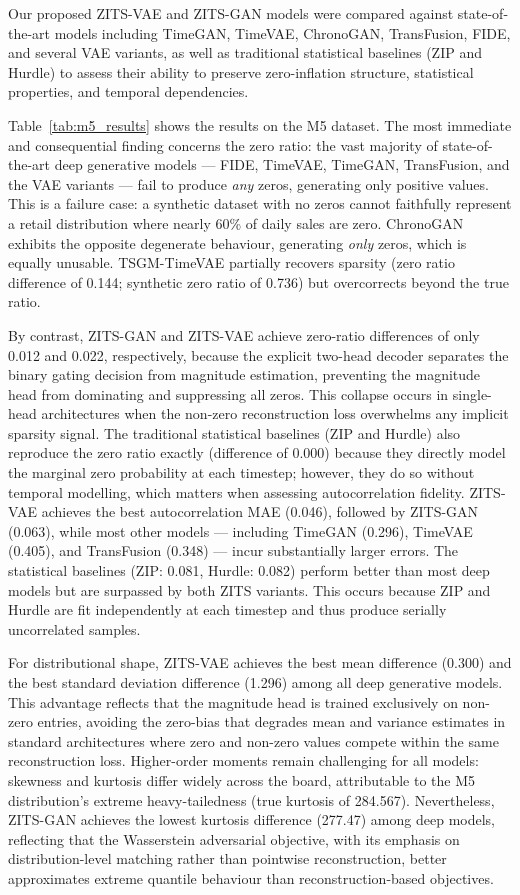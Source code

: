 \documentclass[make,article,submit,moreauthors]{Definitions/mdpi}
\begin{document}
Our proposed ZITS-VAE and ZITS-GAN models were compared against state-of-the-art models including TimeGAN, TimeVAE, ChronoGAN, TransFusion, FIDE, and several VAE variants, as well as traditional statistical baselines (ZIP and Hurdle) to assess their ability to preserve zero-inflation structure, statistical properties, and temporal dependencies.  

Table~\ref{tab:m5_results} shows the results on the M5 dataset. The most immediate and consequential finding concerns the zero ratio: the vast majority of state-of-the-art deep generative models — FIDE, TimeVAE, TimeGAN, TransFusion, and the VAE variants — fail to produce \emph{any} zeros, generating only positive values. This is a failure case: a synthetic dataset with no zeros cannot faithfully represent a retail distribution where nearly 60\% of daily sales are zero. ChronoGAN exhibits the opposite degenerate behaviour, generating \emph{only} zeros, which is equally unusable. TSGM-TimeVAE partially recovers sparsity (zero ratio difference of 0.144; synthetic zero ratio of 0.736) but overcorrects beyond the true ratio.

By contrast, ZITS-GAN and ZITS-VAE achieve zero-ratio differences of only 0.012 and 0.022, respectively, because the explicit two-head decoder separates the binary gating decision from magnitude estimation, preventing the magnitude head from dominating and suppressing all zeros. This collapse occurs in single-head architectures when the non-zero reconstruction loss overwhelms any implicit sparsity signal. The traditional statistical baselines (ZIP and Hurdle) also reproduce the zero ratio exactly (difference of 0.000) because they directly model the marginal zero probability at each timestep; however, they do so without temporal modelling, which matters when assessing autocorrelation fidelity. ZITS-VAE achieves the best autocorrelation MAE (0.046), followed by ZITS-GAN (0.063), while most other models — including TimeGAN (0.296), TimeVAE (0.405), and TransFusion (0.348) — incur substantially larger errors. The statistical baselines (ZIP: 0.081, Hurdle: 0.082) perform better than most deep models but are surpassed by both ZITS variants. This occurs because ZIP and Hurdle are fit independently at each timestep and thus produce serially uncorrelated samples.

For distributional shape, ZITS-VAE achieves the best mean difference (0.300) and the best standard deviation difference (1.296) among all deep generative models. This advantage reflects that the magnitude head is trained exclusively on non-zero entries, avoiding the zero-bias that degrades mean and variance estimates in standard architectures where zero and non-zero values compete within the same reconstruction loss. Higher-order moments remain challenging for all models: skewness and kurtosis differ widely across the board, attributable to the M5 distribution's extreme heavy-tailedness (true kurtosis of 284.567). Nevertheless, ZITS-GAN achieves the lowest kurtosis difference (277.47) among deep models, reflecting that the Wasserstein adversarial objective, with its emphasis on distribution-level matching rather than pointwise reconstruction, better approximates extreme quantile behaviour than reconstruction-based objectives.
\end{document}
